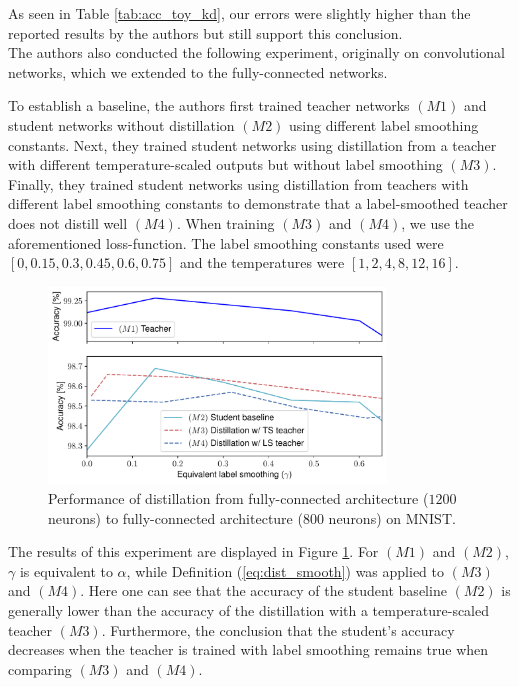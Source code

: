 As seen in Table \ref{tab:acc_toy_kd}, our errors were slightly higher than the reported results by the authors but still support this conclusion.\\

The authors also conducted the following experiment, originally on convolutional networks, which we extended to the fully-connected networks.

To establish a baseline, the authors first trained teacher networks $(M1)$ and student networks without distillation $(M2)$ using different label smoothing constants. Next, they trained student networks using distillation from a teacher with different temperature-scaled outputs but without label smoothing $(M3)$. Finally, they trained student networks using distillation from teachers with different label smoothing constants to demonstrate that a label-smoothed teacher does not distill well $(M4)$. When training $(M3)$ and $(M4)$, we use the aforementioned loss-function. The label smoothing constants used were $[0,0.15,0.3,0.45,0.6,0.75]$ and the temperatures were $[1, 2, 4, 8, 12, 16]$.
\begin{figure}[ht]
\centering
\includegraphics[width=0.8\textwidth]{figures/fc_knowledge_distillation.pdf}
\caption{Performance of distillation from fully-connected architecture ($1200$ neurons) to fully-connected architecture ($800$ neurons) on MNIST.}
\label{fig:fc_dist}
\end{figure}

The results of this experiment are displayed in Figure \ref{fig:fc_dist}. For $(M1)$ and $(M2)$, $\gamma$ is equivalent to $\alpha$, while Definition (\ref{eq:dist_smooth}) was applied to $(M3)$ and $(M4)$. Here one can see that the accuracy of the student baseline $(M2)$ is generally lower than the accuracy of the distillation with a temperature-scaled teacher $(M3)$. Furthermore, the conclusion that the student's accuracy decreases when the teacher is trained with label smoothing remains true when comparing $(M3)$ and $(M4)$.

